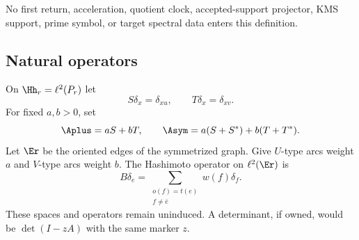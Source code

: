 No first return, acceleration, quotient clock, accepted-support projector,
KMS support, prime symbol, or target spectral data enters this definition.

\subsection{Natural operators}

On $\Hh_r=\ell^2(P_r)$ let
\[
S\delta_x=\delta_{xu},\qquad T\delta_x=\delta_{xv}.
\]
For fixed $a,b>0$, set
\begin{equation}
\Aplus=aS+bT,\qquad
\Asym=a(S+S^*)+b(T+T^*).
\label{eq:vertex-operators}
\end{equation}
Let $\Er$ be the oriented edges of the symmetrized graph.  Give $U$-type
arcs weight $a$ and $V$-type arcs weight $b$.  The Hashimoto operator on
$\ell^2(\Er)$ is
\begin{equation}
B\delta_e=\sum_{\substack{o(f)=t(e)\\f\ne\bar e}}w(f)\delta_f.
\label{eq:hashimoto}
\end{equation}
These spaces and operators remain uninduced.  A determinant, if owned, would
be $\det(I-zA)$ with the same marker $z$.
